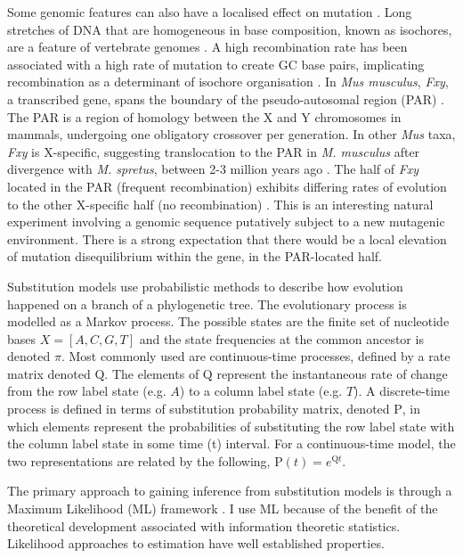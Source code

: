 Some genomic features can also have a localised effect on mutation \citep{Lynch2016GeneticRate}. Long stretches of DNA that are homogeneous in base composition, known as isochores, are a feature of vertebrate genomes \citep{Bernardi1989TheGenome, Bernardi2000IsochoresVertebrates}. A high recombination rate has been associated with a high rate of mutation to create GC base pairs, implicating recombination as a determinant of isochore organisation \citep{Montoya-Burgos2003RecombinationGenomes}. In \textit{Mus musculus}, \textit{Fxy}, a transcribed gene, spans the boundary of the pseudo-autosomal region (PAR) \citep{Palmer1997AMice}. The PAR is a region of homology between the X and Y chromosomes in mammals, undergoing one obligatory crossover per generation.  In other \textit{Mus} taxa, \textit{Fxy} is X-specific, suggesting translocation to the PAR in \textit{M. musculus} after divergence with \textit{M. spretus}, between 2-3 million years ago \citep{Huang2005HowMammals}. The half of \textit{Fxy} located in the PAR (frequent recombination) exhibits differing rates of evolution to the other X-specific half (no recombination) \citep{Perry1999EvolutionaryPosition}. This is an interesting natural experiment involving a genomic sequence putatively subject to a new mutagenic environment. There is a strong expectation that there would be a local elevation of mutation disequilibrium within the gene, in the PAR-located half. 

Substitution models use probabilistic methods to describe how evolution happened on a branch of a phylogenetic tree. The evolutionary process is modelled as a Markov process. The possible states are the finite set of nucleotide bases $X = [A, C, G, T]$ and the state frequencies at the common ancestor is denoted $\pi$. Most commonly used are continuous-time processes, defined by a rate matrix denoted $\mathrm{Q}$. The elements of $\mathrm{Q}$ represent the instantaneous rate of change from the row label state (e.g. $A$) to a column label state (e.g. $T$). A discrete-time process is defined in terms of substitution probability matrix, denoted $\mathrm{P}$, in which elements represent the probabilities of substituting the row label state with the column label state in some time (t) interval. For a continuous-time model, the two representations are related by the following, $\mathrm{P}(t) = e^{\mathrm{Q}t}$. 

The primary approach to gaining inference from substitution models is through a Maximum Likelihood (ML) framework \citep{Whelan2001MolecularPast}. I use ML because of the benefit of the theoretical development associated with information theoretic statistics. Likelihood approaches to estimation have well established properties. 


